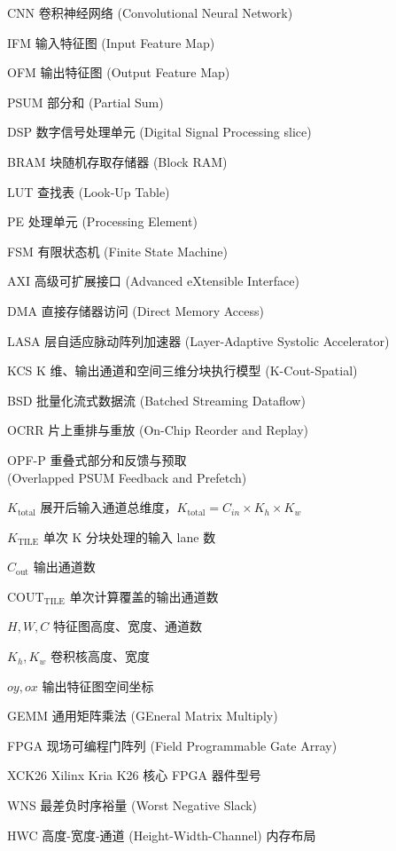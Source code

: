 \begin{denotation}[4.2cm]

\item[CNN] 卷积神经网络 (Convolutional Neural Network)
\item[IFM] 输入特征图 (Input Feature Map)
\item[OFM] 输出特征图 (Output Feature Map)
\item[PSUM] 部分和 (Partial Sum)
\item[DSP] 数字信号处理单元 (Digital Signal Processing slice)
\item[BRAM] 块随机存取存储器 (Block RAM)
\item[LUT] 查找表 (Look-Up Table)
\item[PE] 处理单元 (Processing Element)
\item[FSM] 有限状态机 (Finite State Machine)
\item[AXI] 高级可扩展接口 (Advanced eXtensible Interface)
\item[DMA] 直接存储器访问 (Direct Memory Access)
\item[LASA] 层自适应脉动阵列加速器 (Layer-Adaptive Systolic Accelerator)
\item[KCS] K 维、输出通道和空间三维分块执行模型 (K-Cout-Spatial)
\item[BSD] 批量化流式数据流 (Batched Streaming Dataflow)
\item[OCRR] 片上重排与重放 (On-Chip Reorder and Replay)
\item[OPF-P] 重叠式部分和反馈与预取\\(Overlapped PSUM Feedback and Prefetch)
\item[$K_{\text{total}}$] 展开后输入通道总维度，$K_{\text{total}} = C_{in} \times K_h \times K_w$
\item[$K_{\text{TILE}}$] 单次 K 分块处理的输入 lane 数
\item[$C_{\text{out}}$] 输出通道数
\item[$\text{COUT}_{\text{TILE}}$] 单次计算覆盖的输出通道数
\item[$H, W, C$] 特征图高度、宽度、通道数
\item[$K_h, K_w$] 卷积核高度、宽度
\item[$oy, ox$] 输出特征图空间坐标
\item[GEMM] 通用矩阵乘法 (GEneral Matrix Multiply)
\item[FPGA] 现场可编程门阵列 (Field Programmable Gate Array)
\item[XCK26] Xilinx Kria K26 核心 FPGA 器件型号
\item[WNS] 最差负时序裕量 (Worst Negative Slack)
\item[HWC] 高度-宽度-通道 (Height-Width-Channel) 内存布局

\end{denotation}
